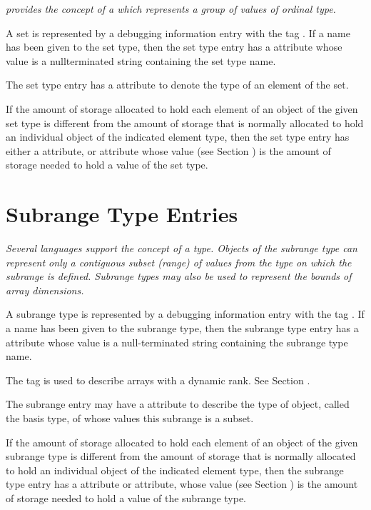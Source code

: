 {\textit{ provides the concept of a  which represents
a group of values of ordinal type.}

A set is represented by a debugging information entry with
the tag \DWTAGsettypeTARG. 
If a name has been given to the
set type, then the set type entry has 
a \DWATname{} attribute
whose value is a null\dash terminated string containing the
set type name.

The set type entry has a
\DWATtype{} attribute to denote the
type of an element of the set.

If the amount of storage allocated to hold each element of an
object of the given set type is different from the amount of
storage that is normally allocated to hold an individual object
of the indicated element type, then the set type entry has
either a \DWATbytesize{} attribute, or 
\DWATbitsize{} attribute
whose value (see Section ) is
the amount of storage needed to hold a value of the set type.

\section{Subrange Type Entries}
\label{chap:subrangetypeentries}

\textit{Several languages support the concept of a 
type. Objects of the subrange type can represent only a contiguous 
subset (range) of values from the type on which the subrange is defined.
Subrange types may also be used to represent the bounds of array dimensions.}

A subrange type is represented by a debugging information
entry with the tag 
\DWTAGsubrangetypeTARG. 
If a name has been given to the subrange type, then the 
subrange type entry has a 
\DWATname{} attribute
whose value is a null-terminated
string containing the subrange type name.

The tag \DWTAGgenericsubrange{}
is used to describe arrays with a dynamic rank. See Section
.

The subrange entry may have a 
\DWATtype{} attribute to describe
the type of object, called the basis type, of whose values
this subrange is a subset.

If the amount of storage allocated to hold each element of an
object of the given subrange type is different from the amount
of storage that is normally allocated to hold an individual
object of the indicated element type, then the subrange
type entry has a 
\DWATbytesize{} attribute or 
\DWATbitsize{}
attribute, whose value 
(see Section )
is the amount of storage needed to hold a value of the subrange type.

}
